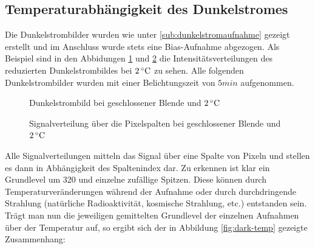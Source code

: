

	\subsection{Temperaturabhängigkeit des Dunkelstromes} %
	\label{sub:temperaturabh_ngigkeit_des_dunkelstromes}

		Die Dunkelstrombilder wurden wie unter \ref{sub:dunkelstromaufnahme} gezeigt erstellt und im Anschluss wurde stets eine Bias-Aufnahme abgezogen.
		Als Beispiel sind in den Abbidungen \ref{dark04} und \ref{dark04_spec} die Intensitätsverteilungen des reduzierten Dunkelstrombildes bei $2\, \text{$^\circ$C}$ zu sehen.
		Alle folgenden Dunkelstrombilder wurden mit einer Belichtungszeit von $5\unit{min}$ aufgenommen.

		\begin{figure}
			\center
			\caption{Dunkelstrombild bei geschlossener Blende und $2\, \text{$^\circ$C}$}
			\label{dark04}
		\end{figure}

		\begin{figure}
			\center
			
			\caption{Signalverteilung über die Pixelspalten bei geschlossener Blende und $2\, \text{$^\circ$C}$}
			\label{dark04_spec}
		\end{figure}

		Alle Signalverteilungen mitteln das Signal über eine Spalte von Pixeln und stellen es dann in Abhängigkeit des Spaltenindex dar.
		Zu erkennen ist klar ein Grundlevel um 320 und einzelne zufällige Spitzen.
		Diese können durch Temperaturveränderungen während der Aufnahme oder durch durchdringende Strahlung (natürliche Radioaktivität, kosmische Strahlung, etc.) entstanden sein.
		Trägt man nun die jeweiligen gemittelten Grundlevel der einzelnen Aufnahmen über der Temperatur auf, so ergibt sich der in Abbildung \ref{fig:dark-temp} gezeigte Zusammenhang:

